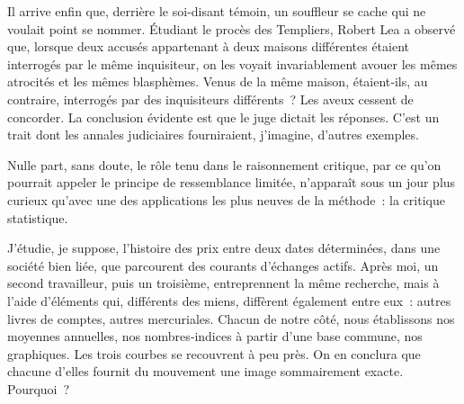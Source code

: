 \documentclass[french,twoside]{book} %
\newcommand{\astermono}{\medskip\centerline{\color{rubric}\large\selectfont{\syms ✻}}\medskip\par}%
\begin{document}
Il arrive enfin que, derrière le soi-disant témoin, un souffleur se cache qui ne voulait point se nommer. Étudiant le procès des Templiers, Robert Lea a observé que, lorsque deux accusés appartenant à deux maisons différentes étaient interrogés par le même inquisiteur, on les voyait inva­riablement avouer les mêmes atrocités et les mêmes blasphèmes. Venus de la même maison, étaient‑ils, au contraire, interrogés par des inquisiteurs différents ? Les aveux cessent de concorder. La conclusion évi­dente est que le juge dictait les réponses. C’est un trait dont les annales judiciaires fourniraient, j’imagine, d’autres exemples.\par

\astermono

\noindent Nulle part, sans doute, le rôle tenu dans le raisonnement critique, par ce qu’on pourrait appeler le principe de ressemblance limitée, n’apparaît sous un jour plus curieux qu’avec une des applications les plus neuves de la méthode : la critique statistique.\par
J’étudie, je suppose, l’histoire des prix entre deux dates déterminées,  
\label{p57} dans une société bien liée, que parcourent des courants d’échanges actifs. Après moi, un second travailleur, puis un troisième, entreprennent la même recherche, mais à l’aide d’éléments qui, différents des miens, dif­fèrent également entre eux : autres livres de comptes, autres mercuriales. Chacun de notre côté, nous établissons nos moyennes annuelles, nos nombres‑indices à partir d’une base commune, nos graphiques. Les trois courbes se recouvrent à peu près. On en conclura que chacune d’elles fournit du mouvement une image sommairement exacte. Pourquoi ?\par
\end{document}
